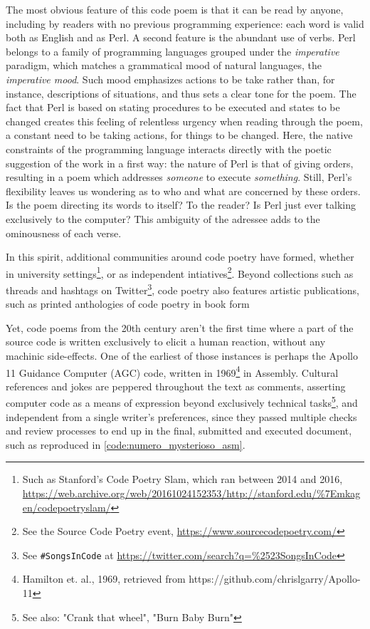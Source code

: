 The most obvious feature of this code poem is that it can be read by anyone, including by readers with no previous programming experience: each word is valid both as English and as Perl. A second feature is the abundant use of verbs. Perl belongs to a family of programming languages grouped under the \emph{imperative} paradigm, which matches a grammatical mood of natural languages, the \emph{imperative mood}. Such mood emphasizes actions to be take rather than, for instance, descriptions of situations, and thus sets a clear tone for the poem. The fact that Perl is based on stating procedures to be executed and states to be changed creates this feeling of relentless urgency when reading through the poem, a constant need to be taking actions, for things to be changed. Here, the native constraints of the programming language interacts directly with the poetic suggestion of the work in a first way: the nature of Perl is that of giving orders, resulting in a poem which addresses \emph{someone} to execute \emph{something}. Still, Perl's flexibility leaves us wondering as to who and what are concerned by these orders. Is the poem directing its words to itself? To the reader? Is Perl just ever talking exclusively to the computer? This ambiguity of the adressee adds to the ominousness of each verse.

In this spirit, additional communities around code poetry have formed, whether in university settings\footnote{Such as Stanford's Code Poetry Slam, which ran between 2014 and 2016, \url{https://web.archive.org/web/20161024152353/http://stanford.edu/\%7Emkagen/codepoetryslam/} }, or as independent intiatives\footnote{See the Source Code Poetry event, \url{https://www.sourcecodepoetry.com/}}. Beyond collections such as threads and hashtags on Twitter\footnote{See \lstinline{#SongsInCode} at \url{https://twitter.com/search?q=\%2523SongsInCode}}, code poetry also features artistic publications, such as printed anthologies of code poetry in book form\cite{bertram_code_2012}\cite{holden_code_2016}

Yet, code poems from the 20th century aren't the first time where a part of the source code is written exclusively to elicit a human reaction, without any machinic side-effects. One of the earliest of those instances is perhaps the Apollo 11 Guidance Computer (AGC) code, written in 1969\footnote{Hamilton et. al., 1969, retrieved from https://github.com/chrislgarry/Apollo-11} in Assembly. Cultural references and jokes are peppered throughout the text as comments, asserting computer code as a means of expression beyond exclusively technical tasks\footnote{See also: "Crank that wheel", "Burn Baby Burn"}, and independent from a single writer's preferences, since they passed multiple checks and review processes to end up in the final, submitted and executed document, such as reproduced in \ref{code:numero_mysterioso_asm}.

